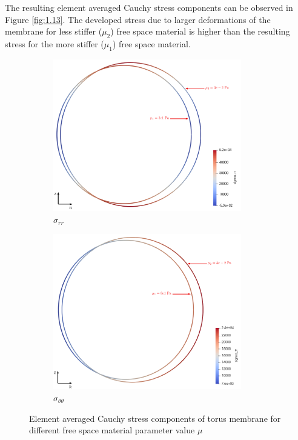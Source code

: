 \documentclass[11pt,a4paper,final]{article}
\begin{document}
The resulting element averaged Cauchy stress components can be observed in Figure \eqref{fig:1.13}. The developed stress due to larger deformations of the membrane for less stiffer ($\mu_2$) free space material is higher than the resulting stress for the more stiffer ($\mu_1$) free space material. \par 

\begin{figure}[h!]
\centering 
\begin{subfigure}[b]{0.49\textwidth}
\centering
\includegraphics[width=0.9\textwidth]{sigma_rr_1e3_vs_1e6_full_load.pdf}
\caption{$\sigma_{rr}$}
\label{fig:1.13.1}
\end{subfigure}
\begin{subfigure}[b]{0.49\textwidth}
\centering
\includegraphics[width=0.9\textwidth]{sigma_tt_1e3_vs_1e6_full_load.pdf}
\caption{$\sigma_{\theta \theta}$}
\label{fig:1.13.2}
\end{subfigure}
\caption{Element averaged Cauchy stress components of torus membrane for different free space material parameter value $\mu$}
\label{fig:1.13}
\end{figure}
\end{document}
